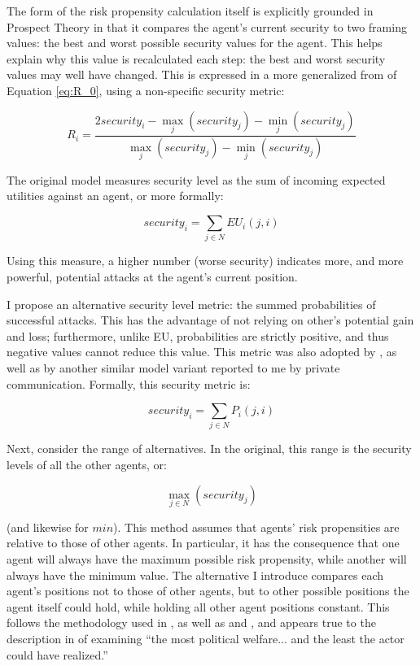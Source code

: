 The form of the risk propensity calculation itself is explicitly grounded in Prospect Theory \citep{kahneman_1984,mcdermott_2001} in that it compares the agent's current security to two framing values: the best and worst possible security values for the agent. This helps explain why this value is recalculated each step: the best and worst security values may well have changed. This is expressed in a more generalized from of Equation \ref{eq:R_0}, using a non-specific security metric:

\begin{equation}
    R_i = \frac{ 2 security_i - \max\limits_j (security_j)  -  \min\limits_j (security_j)}{\max\limits_j (security_j)  -  \min\limits_j (security_j)}
\end{equation}

The original model measures security level as the sum of incoming expected utilities against an agent, or more formally:


\begin{equation}
    security_i = \sum_{j \in N} EU_i(j, i)
\end{equation}

Using this measure, a higher number (worse security) indicates more, and more powerful, potential attacks at the agent's current position.

I propose an alternative security level metric: the summed probabilities of successful attacks. This has the advantage of not relying on other's potential gain and loss; furthermore, unlike EU, probabilities are strictly positive, and thus negative values cannot reduce this value.  This metric was also adopted by \citet{wise_2015a}, as well as by another similar model variant reported to me by private communication. Formally, this security metric is:

\begin{equation}
    security_i = \sum\limits_{j \in N} P_i(j, i) \label{eq:r1_security}
\end{equation}

Next, consider the range of alternatives. In the original, this range is the security levels of all the other agents, or:

\begin{equation}
    \max\limits_{j \in N} (security_j)
\end{equation}

(and likewise for $min$). This method assumes that agents' risk propensities are relative to those of other agents. In particular, it has the consequence that one agent will always have the maximum possible risk propensity, while another will always have the minimum value. The alternative I introduce compares each agent's positions not to those of other agents, but to other possible positions the agent itself could hold, while holding all other agent positions constant. This follows the methodology used in \citet{bdm_1985}, as well as \citet{bdm_1992} and \citet{bennett_2000b}, and appears true to the description in \citet{bdm_2002} of examining ``the most political welfare... and the least the actor could have realized.'' 

